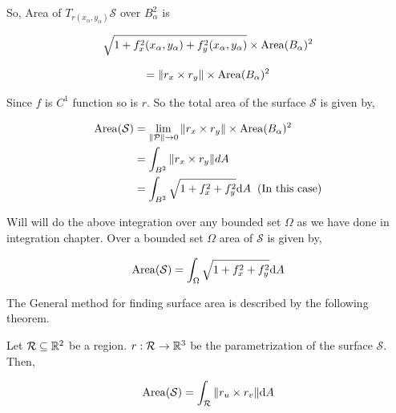 \documentclass[../Analysis-3.tex]{subfiles}
\begin{document}
So, Area of $T_{r(x_{\alpha},y_{\alpha})} \mathcal{S}$ over $B_{\alpha}^2$ is

$$\sqrt{1 + f_x^2(x_{\alpha},y_{\alpha}) + f_y^2(x_{\alpha},y_{\alpha})} \times \operatorname{Area}(B_{\alpha})^2$$

$$ = \norm{r_x \times r_y} \times \operatorname{Area}(B_{\alpha})^2$$

\pagebreak

Since $f$ is $C^1$ function so is $r$. So the total area of the surface $\mathcal{S}$ is given by,

\begin{align*}
  \operatorname{Area} (\mathcal{S}) & = \lim_{\norm{\mathcal{P}} \to 0} \norm{r_x \times r_y} \times \operatorname{Area}(B_{\alpha})^2 \\
                      & = \int_{B^2} \norm{r_x \times r_y} dA                                              \\
                      & = \int_{B^2} \sqrt{1 + f_x^2 +f_y^2} \dd A \hspace{0.2cm}(\text{In this case})
\end{align*}

Will will do the above integration over any bounded set $\Omega$ as we have done in  integration chapter. Over a bounded set $\Omega$ area of $\mathcal{S}$ is given by,

\begin{equation}
  \operatorname{Area} (\mathcal{S}) =  \int_{\Omega} \sqrt{1 + f_x^2 +f_y^2} \dd A \label{eq:surfa}
\end{equation}

The General method for finding surface area is described by the following theorem.

\begin{Thm}{}{}
  Let $\mathcal{R} \subseteq \mathbb{R}^2$ be a region. $r : \mathcal{R} \to \mathbb{R}^3$ be the parametrization of the surface $\mathcal{S}$. Then,

  \[\operatorname{Area}(\mathcal{S}) = \int_{\mathcal{R}} \norm{r_u \times r_v} \dd A\]
\end{Thm}
\end{document}
